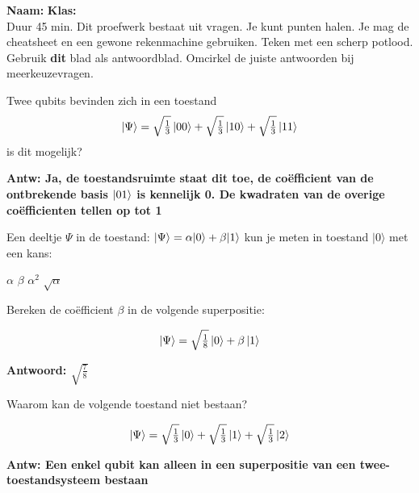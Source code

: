 \documentclass[a4paper, addpoints, 12pt
    , noanswers    %
    ]{exam}
\newcommand{\timelimit}{45 min.}
\begin{document}
\hfill\textbf{Naam:}\enspace\makebox[2in]{\hrulefill} \textbf{Klas:}\enspace\makebox[1in]{\hrulefill} \\

Duur \timelimit
Dit proefwerk bestaat uit \numquestions{} vragen. Je kunt \numpoints{} punten halen. %
Je mag de cheatsheet en een gewone rekenmachine gebruiken. Teken met een scherp potlood. Gebruik \textbf{dit} blad als antwoordblad. Omcirkel de juiste antwoorden bij meerkeuzevragen.

\begin{questions}
\pointsinmargin  %

\question[1]
Twee qubits bevinden zich in een toestand
\[\ket{\Psi} = \sqrt{\tfrac{1}{3}}\ket{00}+ \sqrt{\tfrac{1}{3}}\ket{10}+\sqrt{\tfrac{1}{3}}\ket{11}\]
is dit mogelijk?

\ifprintanswers
\textbf{Antw: Ja, de toestandsruimte staat dit toe, de co\"efficient van de ontbrekende basis $\ket{01}$ is kennelijk 0. De kwadraten van de overige co\"efficienten tellen op tot 1
}
\else
\fillwithlines{.5in}
\fi


\question[1]
Een deeltje $\Psi$ in de toestand: $\ket{\Psi}=\alpha |0 \rangle + \beta |1 \rangle$
kun je meten in toestand $| 0 \rangle$ met een kans:

\begin{choices}
\choice $\alpha$
\choice $\beta$
\correctchoice $\alpha^2$
\choice $\sqrt{\alpha}$
\end{choices}

\question[1]
Bereken de co\"efficient $\beta$ in de volgende superpositie:

\[\ket{\Psi} = \sqrt{\tfrac{1}{8}}\ket{0}+ \beta\ket{1}\]

\ifprintanswers
\textbf{Antwoord: $\sqrt{\tfrac{7}{8}}$
}
\else
\fillwithlines{.5in}
\fi

\question[1]
Waarom kan de volgende toestand niet bestaan?

\[\ket{\Psi} = \sqrt{\tfrac{1}{3}}\ket{0}+ \sqrt{\tfrac{1}{3}}\ket{1}+\sqrt{\tfrac{1}{3}}\ket{2}\]

\ifprintanswers
\textbf{Antw: Een enkel qubit kan alleen in een superpositie van een twee-toestandsysteem bestaan
}
\else
\fillwithlines{.5in}
\fi


\end{questions}
\end{document}

